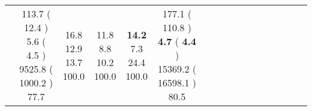 \documentclass[9pt]{article}
\begin{document}
\begin{landscape}
\begin{longtable}{ l | c c c c | c c c c | c c c c | c c c c |}
 &
                    
                            \makecell{              113.7
     (             12.4
    ) \\
            {\footnotesize             5.6
     (              4.5
     )} \\
            {\footnotesize             9525.8
     (            1000.2
    ) } \\
            {\small  \textcolor[rgb]{ 0.646 , 0.255 , 0.1} {77.7  }
} }


             &
                            \makecell{              16.8
     \\
            {\footnotesize             12.9
    } \\  {\footnotesize             13.7
     } \\
            {\small \textcolor[rgb]{ 0.2 , 0.7 , 0.1} {100.0  }
} }
             &                         \makecell{              11.8
     \\
            {\footnotesize             8.8
    } \\  {\footnotesize             10.2
     } \\
            {\small \textcolor[rgb]{ 0.2 , 0.7 , 0.1} {100.0  }
} }
             &
                            \makecell{              \textbf{ 14.2 }
     \\
            {\footnotesize             7.3
    } \\  {\footnotesize             24.4
     } \\
            {\small \textcolor[rgb]{ 0.2 , 0.7 , 0.1} {100.0  }
} }
            

 & 
                            \makecell{              177.1
     (             110.8
    ) \\
            {\footnotesize             \textbf{ 4.7 }
     (              \textbf{ 4.4 }
     )} \\
            {\footnotesize             15369.2
     (            16598.1
    ) } \\
            {\small  \textcolor[rgb]{ 0.59 , 0.31 , 0.1} {80.5  }
} }



\end{longtable}
\end{landscape}
\end{document}
